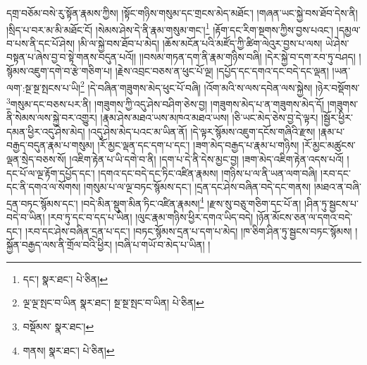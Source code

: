དགྲ་བཅོམ་བསེ་རུ་སྟོན་རྣམས་ཀྱིས། །སྟོང་གཉིས་གསུམ་དང་གྲངས་མེད་མཐོང་། །གཞན་ཡང་སྐྱེ་བས་ཐོབ་དེས་ནི། །སྲིད་པ་བར་མ་མི་མཐོང་ངོ། །སེམས་ཤེས་དེ་ནི་རྣམ་གསུམ་གང་།\footnote{དང་།  སྣར་ཐང་།  པེ་ཅིན། } །རྟོག་དང་རིག་སྔགས་ཀྱིས་བྱས་པའང་། །དམྱལ་བ་པས་ནི་དང་པོ་ཤེས། །མི་ལ་སྐྱེ་བས་ཐོབ་པ་མེད། །ཆོས་མངོན་པའི་མཛོད་ཀྱི་ཚིག་ལེའུར་བྱས་པ་ལས། ཡེ་ཤེས་བསྟན་པ་ཞེས་བྱ་བ་སྟེ་གནས་བདུན་པའོ།། །།བསམ་གཏན་དག་ནི་རྣམ་གཉིས་བཞི། །དེར་སྐྱེ་བ་དག་རབ་ཏུ་བཤད། །སྙོམས་འཇུག་དགེ་བ་རྩེ་གཅིག་པ། །རྗེས་འབྲང་བཅས་ན་ཕུང་པོ་ལྔ། །དཔྱོད་དང་དགའ་དང་བདེ་དང་ལྡན། །ཡན་ལག་:སྔ་སྔ་སྤངས་པ་ཡི།\footnote{ལྔ་ལྔ་སྤང་བ་ཡིན  སྣར་ཐང་། སྔ་སྔ་སྤང་བ་ཡིན།  པེ་ཅིན། } །དེ་བཞིན་གཟུགས་མེད་ཕུང་པོ་བཞི། །འོག་མའི་ས་ལས་དབེན་ལས་སྐྱེས། །ཉེར་བསྡོགས་\footnote{བསྡོམས་  སྣར་ཐང་། }གསུམ་དང་བཅས་པར་ནི། །གཟུགས་ཀྱི་འདུ་ཤེས་བཤིག་ཅེས་བྱ། །གཟུགས་མེད་པ་ན་གཟུགས་མེད་དོ། །གཟུགས་ནི་སེམས་ལས་སྐྱེ་བར་འགྱུར། །རྣམ་ཤེས་མཐའ་ཡས་མཁའ་མཐའ་ཡས། །ཅི་ཡང་མེད་ཅེས་བྱ་དེ་ལྟར། །སྦྱོར་ཕྱིར་དམན་ཕྱིར་འདུ་ཤེས་མེད། །འདུ་ཤེས་མེད་པའང་མ་ཡིན་ནོ། །དེ་ལྟར་སྙོམས་འཇུག་དངོས་གཞིའི་རྫས། །རྣམ་པ་བརྒྱད་བདུན་རྣམ་པ་གསུམ། །རོ་མྱང་ལྡན་དང་དག་པ་དང་། །ཟག་མེད་བརྒྱད་པ་རྣམ་པ་གཉིས། །རོ་མྱང་མཚུངས་ལྡན་སྲེད་བཅས་སོ། །འཇིག་རྟེན་པ་ཡི་དགེ་བ་ནི། །དག་པ་དེ་ནི་དེས་མྱང་བྱ། །ཟག་མེད་འཇིག་རྟེན་འདས་པའོ། །དང་པོ་ལ་ལྔ་རྟོག་དཔྱོད་དང་། །དགའ་དང་བདེ་དང་ཏིང་འཛིན་རྣམས། །གཉིས་པ་ལ་ནི་ཡན་ལག་བཞི། །རབ་དང་དང་ནི་དགའ་ལ་སོགས། །གསུམ་པ་ལ་ལྔ་བཏང་སྙོམས་དང་། །དྲན་དང་ཤེས་བཞིན་བདེ་དང་གནས། །མཐའ་ན་བཞི་དྲན་བཏང་སྙོམས་དང་། །བདེ་མིན་སྡུག་མིན་ཏིང་འཛིན་རྣམས།\footnote{གནས།  སྣར་ཐང་།  པེ་ཅིན། } །རྫས་སུ་བཅུ་གཅིག་དང་པོ་ན། །ཤིན་ཏུ་སྦྱངས་པ་བདེ་བ་ཡིན། །རབ་ཏུ་དང་བ་དད་པ་ཡིན། །ལུང་རྣམ་གཉིས་ཕྱིར་དགའ་ཡིད་བདེ། །ཉོན་མོངས་ཅན་ལ་དགའ་བདེ་དང་། །རབ་དང་ཤེས་བཞིན་དྲན་པ་དང་། །བཏང་སྙོམས་དྲན་པ་དག་པ་མེད། །ཁ་ཅིག་ཤིན་ཏུ་སྦྱངས་བཏང་སྙོམས། །སྐྱོན་བརྒྱད་ལས་ནི་གྲོལ་བའི་ཕྱིར། །བཞི་པ་གཡོ་བ་མེད་པ་ཡིན། །
